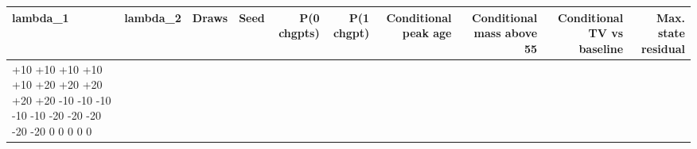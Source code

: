 \begin{tabular}{llrrrrrrrr}
\toprule
lambda_1 & lambda_2 & Draws & Seed & P(0 chgpts) & P(1 chgpt) & Conditional peak age & Conditional mass above 55 & Conditional TV vs baseline & Max. state residual \\
\midrule
+10%
+10%
+10%
+10%
+10%
+20%
+20%
+20%
+20%
+20%
-10%
-10%
-10%
-10%
-10%
-20%
-20%
-20%
-20%
-20%
0%
0%
0%
0%
0%
\bottomrule
\end{tabular}
